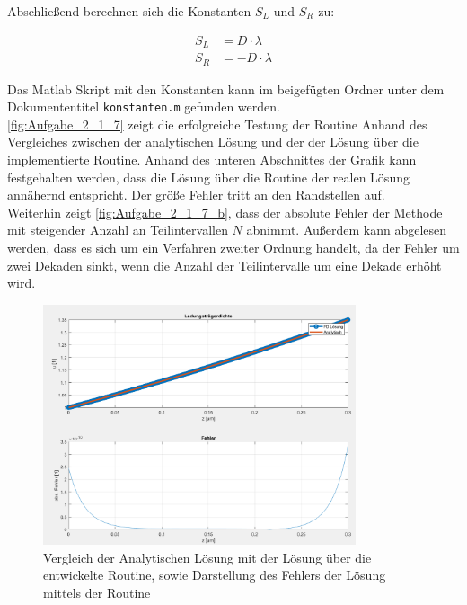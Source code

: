\documentclass[
	pagesize,
	fontsize=12pt,
	paper=a4,
	oneside,
   reqno
]{scrartcl}
\begin{document}
Abschließend berechnen sich die Konstanten $S_L$ und $S_R$ zu:

\begin{align*}
   S_L &= D \cdot \lambda \\
   S_R &= -D \cdot \lambda
\end{align*}

Das Matlab Skript mit den Konstanten kann im beigefügten Ordner unter dem Dokumententitel \texttt{konstanten.m} gefunden werden. \\

\autoref{fig:Aufgabe_2_1_7} zeigt die erfolgreiche Testung der Routine Anhand des Vergleiches zwischen der analytischen Lösung und der der Lösung über die implementierte Routine. Anhand des unteren Abschnittes der Grafik kann festgehalten werden, dass die Lösung über die Routine der realen Lösung annähernd entspricht. Der größe Fehler tritt an den Randstellen auf. \\

Weiterhin zeigt \autoref{fig:Aufgabe_2_1_7_b}, dass der absolute Fehler der Methode mit steigender Anzahl an Teilintervallen $N$ abnimmt. Außerdem kann abgelesen werden, dass es sich um ein Verfahren zweiter Ordnung handelt, da der Fehler um zwei Dekaden sinkt, wenn die Anzahl der Teilintervalle um eine Dekade erhöht wird.

\begin{figure}[H]
   \centering
   \includegraphics[width=0.82\textwidth]{Bilder/Aufgabe_2_1_7.png}
   \caption[Test der Routine linear stationär]{Vergleich der Analytischen Lösung mit der Lösung über die entwickelte Routine, sowie Darstellung des Fehlers der Lösung mittels der Routine}
   \label{fig:Aufgabe_2_1_7}
\end{figure}
\end{document}
